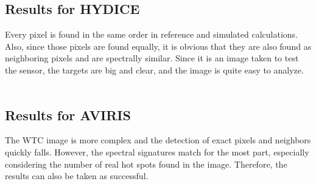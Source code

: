 \subsection{Results for HYDICE}
Every pixel is found in the same order in reference and simulated calculations. Also, since those pixels are found equally, it is obvious that they are also found as neighboring pixels and are spectrally similar. Since it is an image taken to test the sensor, the targets are big and clear, and the image is quite easy to analyze.
\\
\\
\subsection{Results for AVIRIS}
The WTC image is more complex and the detection of exact pixels and neighbors quickly falls. However, the spectral signatures match for the most part, especially considering the number of real hot spots found in the image. Therefore, the results can also be taken as successful.
\pagebreak
